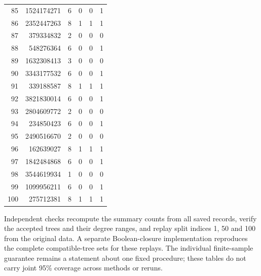 \begin{longtable}{rrrrrr}
85 & 1524174271 & 6 & 0 & 0 & 1\\

86 & 2352447263 & 8 & 1 & 1 & 1\\

87 & 379334832 & 2 & 0 & 0 & 0\\

88 & 548276364 & 6 & 0 & 0 & 1\\

89 & 1632308413 & 3 & 0 & 0 & 0\\

90 & 3343177532 & 6 & 0 & 0 & 1\\

91 & 339188587 & 8 & 1 & 1 & 1\\

92 & 3821830014 & 6 & 0 & 0 & 1\\

93 & 2804609772 & 2 & 0 & 0 & 0\\

94 & 234850423 & 6 & 0 & 0 & 1\\

95 & 2490516670 & 2 & 0 & 0 & 0\\

96 & 162639027 & 8 & 1 & 1 & 1\\

97 & 1842484868 & 6 & 0 & 0 & 1\\

98 & 3544619934 & 1 & 0 & 0 & 0\\

99 & 1099956211 & 6 & 0 & 0 & 1\\

100 & 275712381 & 8 & 1 & 1 & 1\\

\end{longtable}

Independent checks recompute the summary counts from all saved records, verify the accepted trees and their degree ranges, and replay split indices 1, 50 and 100 from the original data. A separate Boolean-closure implementation reproduces the complete compatible-tree sets for these replays. The individual finite-sample guarantee remains a statement about one fixed procedure; these tables do not carry joint 95\% coverage across methods or reruns.


